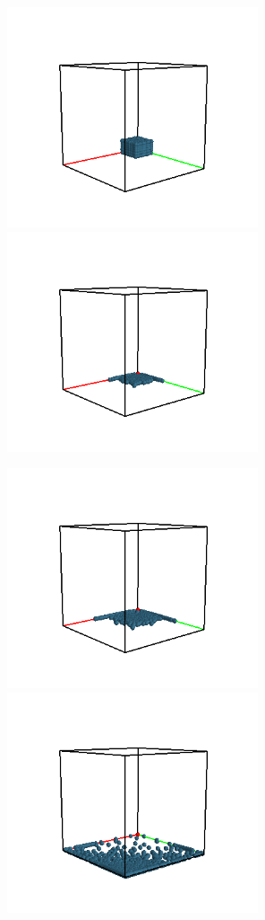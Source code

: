 \documentclass[12pt,fleqn]{article}\usepackage{../../common}
\begin{document}
\includegraphics[width=20em]{glutout-002.png}
\includegraphics[width=20em]{glutout-004.png}

\includegraphics[width=20em]{glutout-006.png}
\includegraphics[width=20em]{glutout-008.png}
\end{document}

